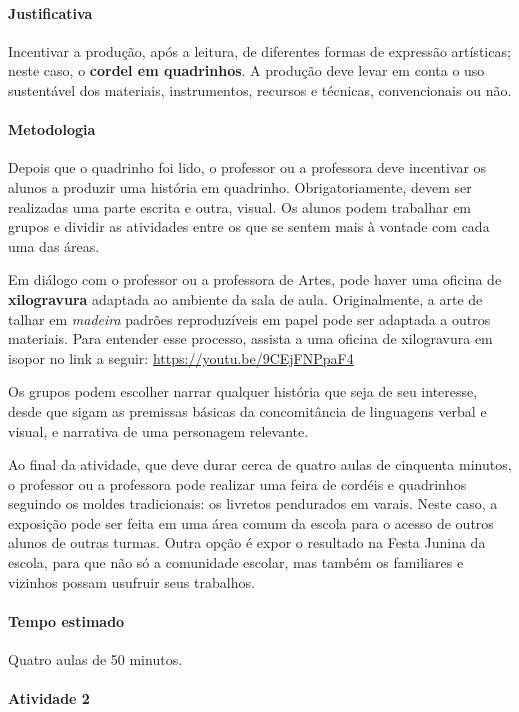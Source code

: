\documentclass[11pt]{extarticle}
\begin{document}
\paragraph{Justificativa} Incentivar a produção, após a leitura, de diferentes formas de 
expressão artísticas; neste caso, o \textbf{cordel em quadrinhos}. A produção 
deve levar em conta o uso sustentável dos materiais, instrumentos, recursos e técnicas,
convencionais ou não.


\paragraph{Metodologia}

Depois que o quadrinho foi lido, o professor ou a professora deve incentivar os alunos
a produzir uma história em quadrinho. Obrigatoriamente, devem ser realizadas uma parte
escrita e outra, visual. Os alunos podem trabalhar em grupos e dividir as atividades
entre os que se sentem mais à vontade com cada uma das áreas.

Em diálogo com o professor ou a professora de Artes, pode haver uma oficina de \textbf{xilogravura}
adaptada ao ambiente da sala de aula. Originalmente, a arte de talhar em \textit{madeira} padrões
reproduzíveis em papel pode ser adaptada a outros materiais. Para entender esse processo, assista a uma oficina de xilogravura em isopor no link a seguir: \url{https://youtu.be/9CEjFNPpaF4}  

Os grupos podem escolher narrar qualquer história que seja de seu interesse,
desde que sigam as premissas básicas da concomitância de linguagens verbal e visual, e 
narrativa de uma personagem relevante. 

Ao final da atividade, que deve durar cerca de quatro aulas de cinquenta minutos,
 o professor ou a professora pode realizar uma feira de cordéis e quadrinhos
 seguindo os moldes tradicionais: os livretos pendurados em varais.
 Neste caso, a exposição pode ser feita em uma área comum da escola para o acesso de outros alunos
 de outras turmas. Outra opção é expor o resultado na Festa Junina da escola, para que não só a comunidade
 escolar, mas também os familiares e vizinhos possam usufruir seus trabalhos.


\paragraph{Tempo estimado} Quatro aulas de 50 minutos.

\paragraph{Atividade 2}
\end{document}
